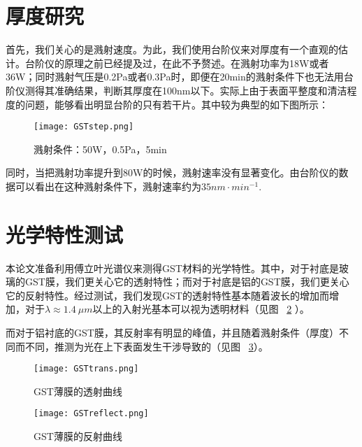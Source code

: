 \section{厚度研究}
首先，我们关心的是溅射速度。为此，我们使用台阶仪来对厚度有一个直观的估计。台阶仪的原理之前已经提及过，在此不予赘述。在溅射功率为18W或者36W；同时溅射气压是0.2Pa或者0.3Pa时，即便在20min的溅射条件下也无法用台阶仪测得其准确结果，判断其厚度在100nm以下。实际上由于表面平整度和清洁程度的问题，能够看出明显台阶的只有若干片。其中较为典型的如下图所示：
\begin{figure}[H] %
  \centering
  \texttt{[image: GSTstep.png]}
  \caption{溅射条件：50W，0.5Pa，5min}
  \label{fig:step}
\end{figure}
同时，当把溅射功率提升到80W的时候，溅射速率没有显著变化。由台阶仪的数据可以看出在这种溅射条件下，溅射速率约为$35nm \cdot{} min^{-1}$.

\section{光学特性测试}
\label{sub:testFourier}
本论文准备利用傅立叶光谱仪来测得GST材料的光学特性。其中，对于衬底是玻璃的GST膜，我们更关心它的透射特性；而对于衬底是铝的GST膜，我们更关心它的反射特性。经过测试，我们发现GST的透射特性基本随着波长的增加而增加，对于$\lambda \approx 1.4\ \mu m$以上的入射光基本可以视为透明材料（见图 ~\ref{fig:trans} ）。

而对于铝衬底的GST膜，其反射率有明显的峰值，并且随着溅射条件（厚度）不同而不同，推测为光在上下表面发生干涉导致的（见图 ~\ref{fig:reflect}）。
\begin{figure}[H] %
  \centering
  \texttt{[image: GSTtrans.png]}
  \caption{GST薄膜的透射曲线}
  \label{fig:trans}
\end{figure}
\begin{figure}[H] %
  \centering
  \texttt{[image: GSTreflect.png]}
  \caption{GST薄膜的反射曲线}
  \label{fig:reflect}
\end{figure}



